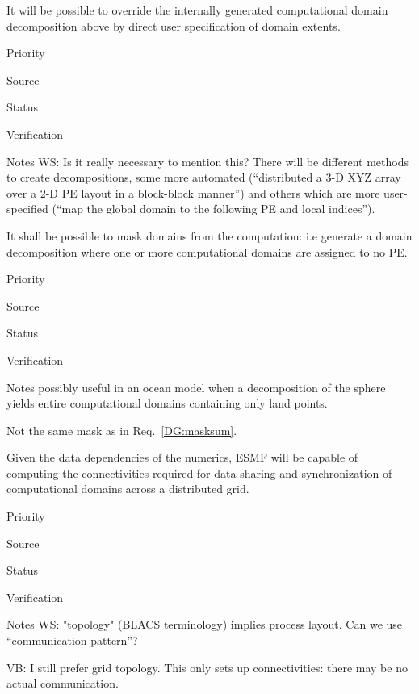 
It will be possible to override the internally generated computational
domain decomposition above by direct user specification of domain
extents.

\begin{reqlist}
\item[Priority]
\item[Source]
\item[Status]
\item[Verification]
\item[Notes]  WS: Is it really necessary to mention this? There will
be different methods to create decompositions, some more automated
(``distributed a 3-D XYZ array over a 2-D PE layout in a block-block
manner'') and others which are more user-specified (``map the global domain
to the following PE and local indices'').

\end{reqlist}

 \label{DG:masklayout}

It shall be possible to mask domains from the computation: i.e
generate a domain decomposition where one or more computational
domains are assigned to no PE.

\begin{reqlist}
\item[Priority]
\item[Source]
\item[Status]
\item[Verification]
\item[Notes] possibly useful in an ocean model when a decomposition
  of the sphere yields entire computational domains containing only
  land points.

  Not the same mask as in Req.~\ref{DG:masksum}.
\end{reqlist}


Given the data dependencies of the numerics, ESMF will be capable of
computing the connectivities required for data sharing and
synchronization of computational domains across a distributed grid.


\begin{reqlist}
\item[Priority]
\item[Source]
\item[Status]
\item[Verification]
\item[Notes] WS:  "topology" (BLACS terminology) implies process layout.
Can we use ``communication pattern''?

VB: I still prefer grid topology. This only sets up connectivities:
there may be no actual communication.

\end{reqlist}

